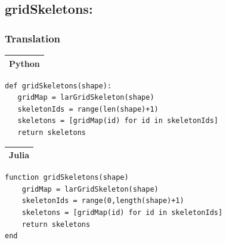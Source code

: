 \documentclass{article}
\begin{document}
\subsection{gridSkeletons:}
\subsubsection{Translation}
\begin{flushleft} \small

\vspace{1ex}
\begin{center}
\begin{tabular}{|p{16cm}|}
\hline
\cellcolor[gray]{.9}Python\\
\hline
\end{tabular}
\end{center}


\begin{list}{}{} \item
\begin{Verbatim}[tabsize=4]
def gridSkeletons(shape):
   gridMap = larGridSkeleton(shape)
   skeletonIds = range(len(shape)+1)
   skeletons = [gridMap(id) for id in skeletonIds]
   return skeletons
\end{Verbatim}
\end{list}

\begin{center}
\begin{tabular}{|p{16cm}|}
\hline
\cellcolor[gray]{.9}Julia\\
\hline
\end{tabular}
\end{center}

\begin{list}{}{} \item
\begin{Verbatim}[tabsize=4]
function gridSkeletons(shape)
    gridMap = larGridSkeleton(shape)
    skeletonIds = range(0,length(shape)+1)
    skeletons = [gridMap(id) for id in skeletonIds]
    return skeletons
end
\end{Verbatim}
\end{list}

\vspace{2ex}


\end{flushleft}
\end{document}
